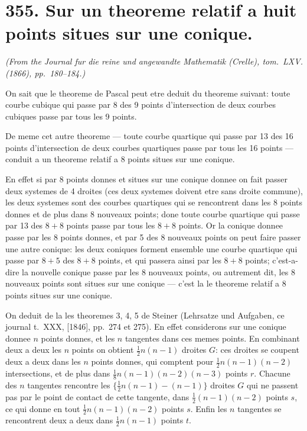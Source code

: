 \documentclass[11pt,a4paper]{article}
\theoremstyle{plain}
\begin{document}
\section*{355. Sur un theoreme relatif a huit points situes sur une conique.\quad [355]}
\label{sec:355}

\begin{flushright}
\textit{(From the Journal fur die reine und angewandte Mathematik (Crelle), tom.~LXV. (1866), pp.~180--184.)}
\end{flushright}

On sait que le theoreme de Pascal peut etre deduit du theoreme suivant: toute courbe cubique qui passe par 8 des 9 points d'intersection de deux courbes cubiques passe par tous les 9 points.

De meme cet autre theoreme --- toute courbe quartique qui passe par 13 des 16 points d'intersection de deux courbes quartiques passe par tous les 16 points --- conduit a un theoreme relatif a 8 points situes sur une conique.

En effet si par 8 points donnes et situes sur une conique donnee on fait passer deux systemes de 4 droites (ces deux systemes doivent etre sans droite commune), les deux systemes sont des courbes quartiques qui se rencontrent dans les 8 points donnes et de plus dans 8 nouveaux points; done toute courbe quartique qui passe par 13 des $8+8$ points passe par tous les $8+8$ points. Or la conique donnee passe par les 8 points donnes, et par 5 des 8 nouveaux points on peut faire passer une autre conique: les deux coniques forment ensemble une courbe quartique qui passe par $8+5$ des $8+8$ points, et qui passera ainsi par les $8+8$ points; c'est-a-dire la nouvelle conique passe par les 8 nouveaux points, ou autrement dit, les 8 nouveaux points sont situes sur une conique --- c'est la le theoreme relatif a 8 points situes sur une conique.

On deduit de la les theoremes 3, 4, 5 de Steiner (Lehrsatze und Aufgaben, ce journal t.~XXX, [1846], pp.~274 et 275). En effet considerons sur une conique donnee $n$ points donnes, et les $n$ tangentes dans ces memes points. En combinant deux a deux les $n$ points on obtient $\frac12 n(n-1)$ droites $G$: ces droites se coupent deux a deux dans les $n$ points donnes, qui comptent pour $\frac12 n(n-1)(n-2)$ intersections, et de plus dans $\frac{1}{8}n(n-1)(n-2)(n-3)$ points $r$. Chacune des $n$ tangentes rencontre les $\{\frac12 n(n-1) - (n-1)\}$ droites $G$ qui ne passent pas par le point de contact de cette tangente, dans $\frac12 (n-1)(n-2)$ points $s$, ce qui donne en tout $\frac12 n(n-1)(n-2)$ points $s$. Enfin les $n$ tangentes se rencontrent deux a deux dans $\frac12 n(n-1)$ points $t$.
\end{document}
